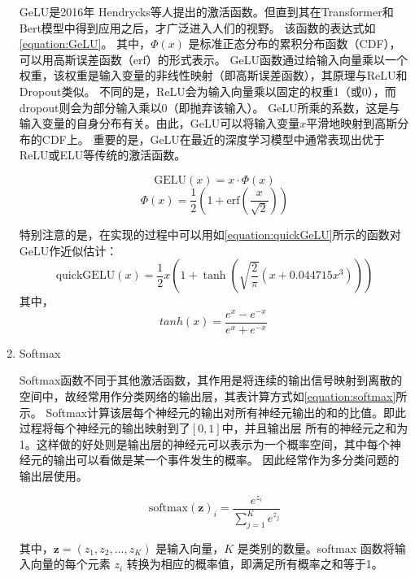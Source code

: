 \begin{enumerate}
  GeLU是2016年 Hendrycks等人提出的激活函数\cite{2016GeLU}。但直到其在Transformer和Bert模型中得到应用之后，才广泛进入人们的视野。
  该函数的表达式如\cref{equation:GeLU}。
  其中，$\Phi(x)$ 是标准正态分布的累积分布函数（CDF），可以用高斯误差函数（erf）的形式表示。
  GeLU函数通过给输入向量乘以一个权重，该权重是输入变量的非线性映射（即高斯误差函数），其原理与ReLU和Dropout类似。
  不同的是，ReLU会为输入向量乘以固定的权重1（或0），而dropout则会为部分输入乘以0（即抛弃该输入）。
  GeLU所乘的系数，这是与输入变量的自身分布有关。由此，GeLU可以将输入变量$x$平滑地映射到高斯分布的CDF上。
  重要的是，GeLU在最近的深度学习模型中通常表现出优于ReLU或ELU等传统的激活函数。

  \begin{equation}
    \label{equation:GeLU}
    \text{GELU}(x) = x \cdot \Phi(x) 
  \end{equation}
   \begin{equation}
    \label{equation:Gauss}
    \Phi(x) = \frac{1}{2} \left(1 + \text{erf} \left(\frac{x}{\sqrt{2}}\right)\right)
  \end{equation}
  
  特别注意的是，在实现的过程中可以用如\cref{equation:quickGeLU}所示的函数对GeLU作近似估计：
  \begin{equation}
    \label{equation:quickGeLU}
    \text{quickGELU}(x) = \frac{1}{2}x\left(1 + \tanh\left(\sqrt{\frac{2}{\pi}}\left(x + 0.044715x^3\right)\right)\right)
  \end{equation}
  其中，
  \begin{equation}
    tanh(x) = \frac{{e^{x} - e^{-x}}}{{e^{x} + e^{-x}}}
\
  \end{equation}

  \item Softmax

  Softmax函数不同于其他激活函数，其作用是将连续的输出信号映射到离散的空间中，故经常用作分类网络的输出层，其表计算方式如\cref{equation:softmax}所示。
  Softmax计算该层每个神经元的输出对所有神经元输出的和的比值。即此过程将每个神经元的输出映射到了$[0,1]$中，并且输出层
  所有的神经元之和为1。这样做的好处则是输出层的神经元可以表示为一个概率空间，其中每个神经元的输出可以看做是某一个事件发生的概率。
  因此经常作为多分类问题的输出层使用。

\begin{equation}
  \label{equation:softmax}
  \text{softmax}(\mathbf{z})_i = \frac{e^{z_i}}{\sum_{j=1}^{K} e^{z_j}}
\end{equation}

其中，$\mathbf{z} = (z_1, z_2, ..., z_K)$ 是输入向量，$K$ 是类别的数量。softmax 函数将输入向量的每个元素 $z_i$ 转换为相应的概率值，即满足所有概率之和等于1。

\end{enumerate}

